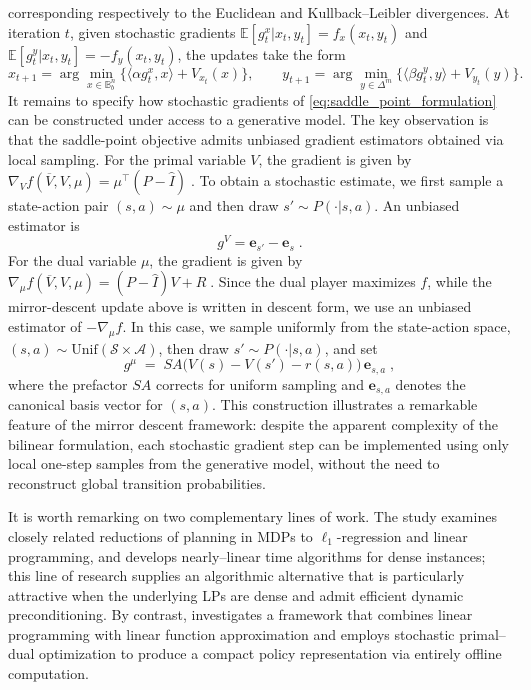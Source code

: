 \documentclass{article}
\numberwithin{equation}{section}
\newcommand{\E}{\mathbb E}
\newcommand{\eqsp}{\;}
\begin{document}
corresponding respectively to the Euclidean and Kullback--Leibler divergences. At iteration \(t\), given stochastic gradients \( \E[g_t^x|x_t, y_t] = f_x(x_t,y_t)\) and \(\E[g_t^y|x_t, y_t] = {-f_y(x_t,y_t)}\), the updates take the form
\[
    x_{t+1} = \arg\min_{x \in \mathbb{B}_b^n} \bigl\{\langle \alpha g_t^x, x\rangle + V_{x_t}(x)\bigr\}, 
    \qquad 
    y_{t+1} = \arg\min_{y \in \Delta^m} \bigl\{\langle \beta g_t^y, y\rangle + V_{y_t}(y)\bigr\}.
\]
It remains to specify how stochastic gradients of \eqref{eq:saddle_point_formulation} can be constructed under access to a generative model. 
The key observation is that the saddle-point objective admits unbiased gradient estimators obtained via local sampling. For the primal variable \(V\), the gradient is given by
\(
    \nabla_V f(\overline{V}, V, \mu) = {\mu^\top (P - \widehat{I})}\eqsp.
\)
To obtain a stochastic estimate, we first sample a state-action pair \((s,a) \sim \mu\) and then draw \(s' \sim P(\cdot | s,a)\). An unbiased estimator is
\[
    g^V = \mathbf{e}_{s'} - \mathbf{e}_s\eqsp.
\]
For the dual variable \(\mu\), the gradient is given by
\(
    \nabla_\mu f(\overline{V}, V, \mu) = {(P - \widehat{I} )V + R\eqsp.}
\)
{Since the dual player maximizes \(f\), while the mirror-descent update above is written in descent form, we use an unbiased estimator of \(-\nabla_\mu f\).}
In this case, we sample uniformly from the state-action space, \((s,a) \sim \mathrm{Unif}(\mathcal{S}\times\mathcal{A})\), then draw $s' \sim P(\cdot | s,a)$, and set
\[
    {g^\mu \;=\; SA \bigl(V(s) - V(s') - r(s,a)\bigr)\,\mathbf{e}_{s,a}\eqsp,}
\]
where the prefactor \(SA\) corrects for uniform sampling and $\mathbf{e}_{s,a}$ denotes the canonical basis vector for \((s,a)\).  
This construction illustrates a remarkable feature of the mirror descent framework: despite the apparent complexity of the bilinear formulation, each stochastic gradient step can be implemented using only local one-step samples from the generative model, without the need to reconstruct global transition probabilities.

It is worth remarking on two complementary lines of work. The study \cite{van2021minimum} examines closely related reductions of planning in MDPs to $\ell_1$-regression and linear programming, and develops nearly–linear time algorithms for dense instances; this line of research supplies an algorithmic alternative that is particularly attractive when the underlying LPs are dense and admit efficient dynamic preconditioning. By contrast, \cite{neu2023efficient} investigates a framework that combines linear programming with linear function approximation and employs stochastic primal–dual optimization to produce a compact policy representation via entirely offline computation.
\end{document}

